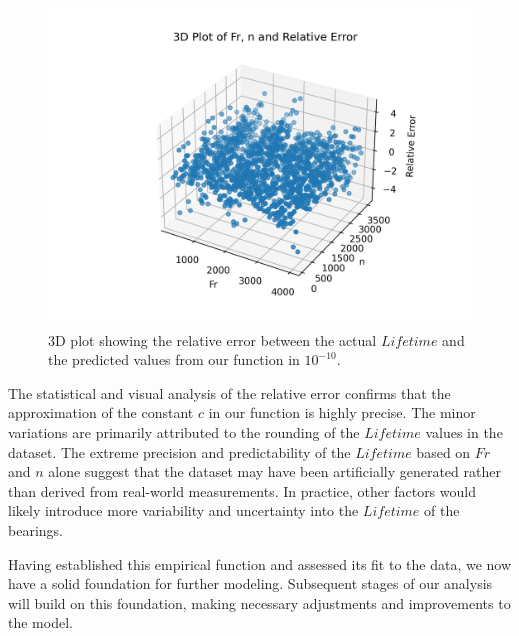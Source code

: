 \begin{figure}[ht]
    \centering
    \includegraphics[width=\textwidth]{assets/bearings-eda/3dplot-error.png}
    \caption{3D plot showing the relative error between the actual \(Lifetime\) and the predicted values from our function in \(10^{-10}\).}
    \label{fig:bearings-error}
\end{figure}

The statistical and visual analysis of the relative error confirms that the approximation of the constant \(c\) in our function is highly precise. The minor variations are primarily attributed to the rounding of the \(Lifetime\) values in the dataset. The extreme precision and predictability of the \(Lifetime\) based on \(Fr\) and \(n\) alone suggest that the dataset may have been artificially generated rather than derived from real-world measurements. In practice, other factors would likely introduce more variability and uncertainty into the \(Lifetime\) of the bearings.

Having established this empirical function and assessed its fit to the data, we now have a solid foundation for further modeling. Subsequent stages of our analysis will build on this foundation, making necessary adjustments and improvements to the model.
